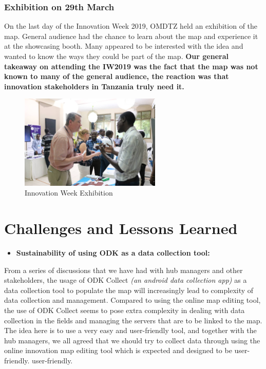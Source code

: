 \documentclass[a4paper,12pt,twoside]{article}
\begin{document}
\subsubsection{Exhibition on 29th March}
On the last day of the Innovation Week 2019, OMDTZ held an exhibition of the map. General audience had the chance to learn about the map and experience it at the showcasing booth. Many appeared to be interested with the idea and wanted to know the ways they could be part of the map. \textbf{Our general takeaway on attending the IW2019 was the fact that the map was not known to many of the general audience, the reaction was that innovation stakeholders in Tanzania truly need it.}

\begin{figure}[h]
  \centering
  \caption{Innovation Week Exhibition}
  \includegraphics[width=0.6\textwidth]{images/seed_star_training.jpeg}
\end{figure}

\newpage
\section{Challenges and Lessons Learned}
\begin{itemize}
    \item \textbf{Sustainability of using ODK as a data collection tool:}
\end{itemize}
From a series of discussions that we have had with hub managers and other stakeholders, the usage of ODK Collect \textit{(an android data collection app)} as a data collection tool to populate the map will increasingly lead to complexity of data collection and management. Compared to using the online map editing tool, the use of ODK Collect seems to pose extra complexity in dealing with data collection in the fields and managing the servers that are to be linked to the map. The idea here is to use a very easy and user-friendly tool, and together with the hub managers, we all agreed that we should try to collect data through using the online innovation map editing tool which is expected and designed to be user-friendly. user-friendly.
\end{document}
